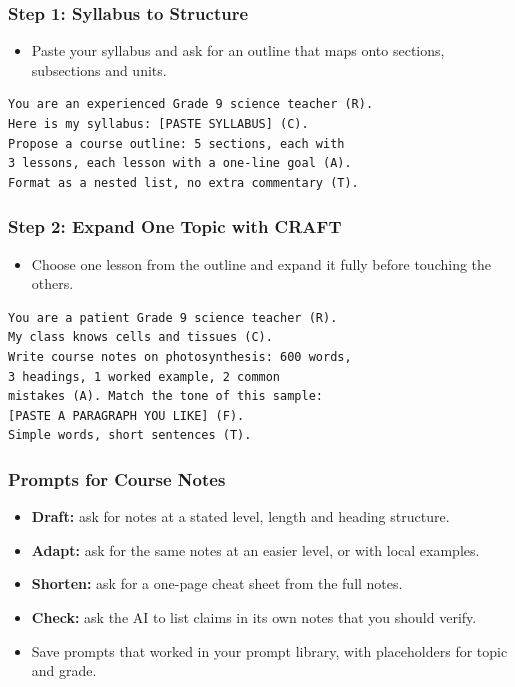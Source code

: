 \begin{frame}[fragile]\frametitle{Step 1: Syllabus to Structure}
\begin{itemize}
\item Paste your syllabus and ask for an outline that maps onto sections, subsections and units.
\end{itemize}
\begin{lstlisting}[language=HTML]
You are an experienced Grade 9 science teacher (R).
Here is my syllabus: [PASTE SYLLABUS] (C).
Propose a course outline: 5 sections, each with
3 lessons, each lesson with a one-line goal (A).
Format as a nested list, no extra commentary (T).
\end{lstlisting}
\end{frame}

\begin{frame}[fragile]\frametitle{Step 2: Expand One Topic with CRAFT}
\begin{itemize}
\item Choose one lesson from the outline and expand it fully before touching the others.
\end{itemize}
\begin{lstlisting}[language=HTML]
You are a patient Grade 9 science teacher (R).
My class knows cells and tissues (C).
Write course notes on photosynthesis: 600 words,
3 headings, 1 worked example, 2 common
mistakes (A). Match the tone of this sample:
[PASTE A PARAGRAPH YOU LIKE] (F).
Simple words, short sentences (T).
\end{lstlisting}
\end{frame}

\begin{frame}[fragile]\frametitle{Prompts for Course Notes}
\begin{itemize}
\item \textbf{Draft:} ask for notes at a stated level, length and heading structure.
\item \textbf{Adapt:} ask for the same notes at an easier level, or with local examples.
\item \textbf{Shorten:} ask for a one-page cheat sheet from the full notes.
\item \textbf{Check:} ask the AI to list claims in its own notes that you should verify.
\item Save prompts that worked in your prompt library, with placeholders for topic and grade.
\end{itemize}
\end{frame}

